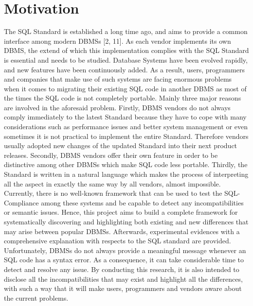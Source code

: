  \section{Motivation}
The SQL Standard is established a long time ago, and aims to provide a common interface among modern DBMSs [2, 11]. As each vendor implements its own DBMS, the extend of which this implementation complies with the SQL Standard is essential and needs to be studied. Database Systems have been evolved rapidly, and new features have been continuously added. As a result, users, programmers and companies that make use of such systems are facing enormous problems when it comes to migrating their existing SQL code in another DBMS as most of the times the SQL code is not completely portable. Mainly three major reasons are involved in the aforesaid problem.  Firstly, DBMS vendors do not always comply immediately to the latest Standard because they have to cope with many considerations such as performance issues and better system management or even sometimes it is not practical to implement the entire Standard. Therefore vendors usually adopted new changes of the updated Standard into their next product releases. Secondly, DBMS vendors offer their own feature in order to be distinctive among other DBMSs which make SQL code less portable. Thirdly, the Standard is written in a natural language which makes the process of interpreting all the aspect in exactly the same way by all vendors, almost impossible.  Currently, there is no well-known framework that can be used to test the SQL-Compliance among these systems and be capable to detect any incompatibilities or semantic issues. Hence, this project aims to build a complete framework for systematically discovering and highlighting both existing and new differences that may arise between popular DBMSs. Afterwards, experimental evidences with a comprehensive explanation with respects to the SQL standard are provided. Unfortunately, DBMSs do not always provide a meaningful message whenever an SQL code has a syntax error. As a consequence, it can take considerable time to detect and resolve any issue. By conducting this research, it is also intended to disclose all the incompatibilities that may exist and highlight all the differences, with such a way that it will make users, programmers and vendors aware about the current problems.
 
